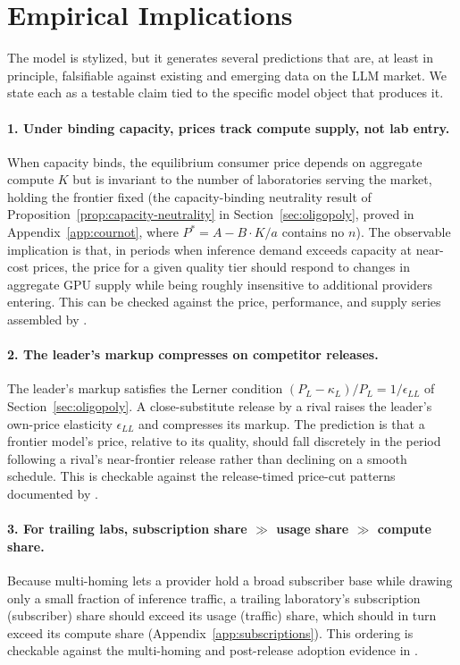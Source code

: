 \documentclass[11pt]{article}
\begin{document}
\section{Empirical Implications}
\label{sec:empirical}

The model is stylized, but it generates several predictions that are, at least in principle, falsifiable against existing and emerging data on the LLM market. We state each as a testable claim tied to the specific model object that produces it.

\paragraph{1. Under binding capacity, prices track compute supply, not lab entry.} When capacity binds, the equilibrium consumer price depends on aggregate compute $K$ but is invariant to the number of laboratories serving the market, holding the frontier fixed (the capacity-binding neutrality result of Proposition~\ref{prop:capacity-neutrality} in Section~\ref{sec:oligopoly}, proved in Appendix~\ref{app:cournot}, where $P^*=A-B\cdot K/a$ contains no $n$). The observable implication is that, in periods when inference demand exceeds capacity at near-cost prices, the price for a given quality tier should respond to changes in aggregate GPU supply while being roughly insensitive to additional providers entering. This can be checked against the price, performance, and supply series assembled by \citet{demirerEtAl2025}.

\paragraph{2. The leader's markup compresses on competitor releases.} The leader's markup satisfies the Lerner condition $(P_L-\kappa_L)/P_L=1/\epsilon_{LL}$ of Section~\ref{sec:oligopoly}. A close-substitute release by a rival raises the leader's own-price elasticity $\epsilon_{LL}$ and compresses its markup. The prediction is that a frontier model's price, relative to its quality, should fall discretely in the period following a rival's near-frontier release rather than declining on a smooth schedule. This is checkable against the release-timed price-cut patterns documented by \citet{demirerEtAl2025}.

\paragraph{3. For trailing labs, subscription share $\gg$ usage share $\gg$ compute share.} Because multi-homing lets a provider hold a broad subscriber base while drawing only a small fraction of inference traffic, a trailing laboratory's subscription (subscriber) share should exceed its usage (traffic) share, which should in turn exceed its compute share (Appendix~\ref{app:subscriptions}). This ordering is checkable against the multi-homing and post-release adoption evidence in \citet{fradkin2025demand}.
\end{document}

